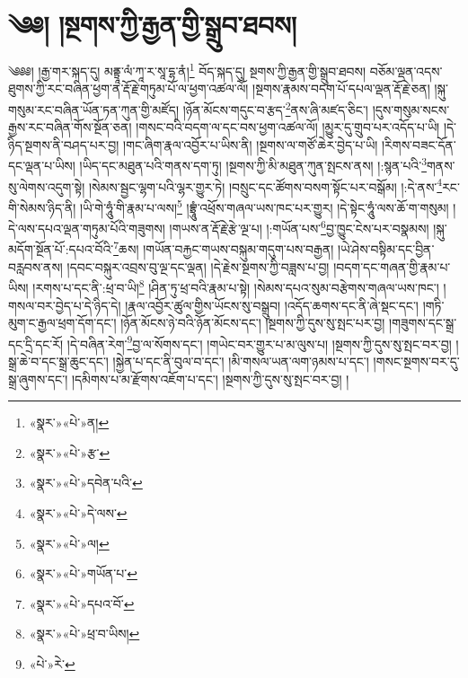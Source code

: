 \chapter{༄༅། །སྔགས་ཀྱི་རྒྱན་གྱི་སྒྲུབ་ཐབས།}༄༅༅། །རྒྱ་གར་སྐད་དུ། མནྟྲཱ་ལཾ་ཀཱ་ར་སཱ་དྷ་ནཾ།\footnote{«སྣར་»«པེ་»ན།} བོད་སྐད་དུ། སྔགས་ཀྱི་རྒྱན་གྱི་སྒྲུབ་ཐབས། བཅོམ་ལྡན་འདས་ཐུགས་ཀྱི་རང་བཞིན་ཕྱག་ན་རྡོ་རྗེ་གཏུམ་པོ་ལ་ཕྱག་འཚལ་ལོ། །སྔགས་རྣམས་བདག་པོ་དཔལ་ལྡན་རྡོ་རྗེ་ཅན། །སྐུ་གསུམ་རང་བཞིན་ཡོན་ཏན་ཀུན་གྱི་མཛོད། །ཉོན་མོངས་གདུང་བ་རྩད་\footnote{«སྣར་»«པེ་»རྩ་}ནས་ཞི་མཛད་ཅིང་། །དུས་གསུམ་སངས་རྒྱས་རང་བཞིན་གོས་སྔོན་ཅན། །གསང་བའི་བདག་ལ་དང་བས་ཕྱག་འཚལ་ལོ། །མྱུར་དུ་གྲུབ་པར་འདོད་པ་ཡི། །དེ་ཉིད་སྔགས་ནི་བཤད་པར་བྱ། །གང་ཞིག་རྣལ་འབྱོར་པ་ཡིས་ནི། །སྔགས་ལ་གཙོ་ཆེར་བྱེད་པ་ཡི། །རིགས་བཟང་དོན་དང་ལྡན་པ་ཡིས། །ཡིད་དང་མཐུན་པའི་གནས་དག་ཏུ། །སྔགས་ཀྱི་མི་མཐུན་ཀུན་སྤངས་ནས། །:སྙན་པའི་\footnote{«སྣར་»«པེ་»དབེན་པའི་}གནས་སུ་ལེགས་འདུག་སྟེ། །སེམས་སྦྱང་ལྷག་པའི་ལྷར་གྱུར་ཏེ། །བསྲུང་དང་ཚོགས་བསག་སྟོང་པར་བསྒོམ། །:དེ་ནས་\footnote{«སྣར་»«པེ་»དེ་ལས་}རང་གི་སེམས་ཉིད་ནི། །ཡི་གེ་ཧཱུཾ་གི་རྣམ་པ་ལས།\footnote{«སྣར་»«པེ་»ལ།} །བྷྲཱུཾ་འཕྲོས་གཞལ་ཡས་ཁང་པར་གྱུར། །དེ་སྟེང་ཧཱུཾ་ལས་ཆོ་ག་གསུམ། །དེ་ལས་དཔའ་ལྡན་གཏུམ་པོའི་གཟུགས། །གཡས་ན་རྡོ་རྗེ་རྩེ་ལྔ་པ། །:གཡོན་པས་\footnote{«སྣར་»«པེ་»གཡོན་པ་}བྱ་ཁྱུང་ངེས་པར་བསྣམས། །སྐུ་མདོག་སྔོན་པོ་:དཔའ་བོའི་\footnote{«སྣར་»«པེ་»དཔའ་བོ་}ཆས། །གཡོན་བརྐྱང་གཡས་བསྐུམ་གདུག་པས་བརྒྱན། །ཡེ་ཤེས་བསྟིམ་དང་བྱིན་བརླབས་ནས། །དབང་བསྐུར་འབྲས་བུ་ལྔ་དང་ལྡན། །དེ་རྗེས་སྔགས་ཀྱི་བཟླས་པ་བྱ། །བདག་དང་གཞན་གྱི་རྣམ་པ་ཡིས། །རགས་པ་དང་ནི་:ཕྲ་བ་ཡི།\footnote{«སྣར་»«པེ་»ཕྲ་བ་ཡིས།} །ཤིན་ཏུ་ཕྲ་བའི་རྣམ་པ་སྟེ། །སེམས་དཔའ་སུམ་བརྩེགས་གཞལ་ཡས་ཁང་། །གསལ་བར་བྱེད་པ་དེ་ཉིད་དེ། །རྣལ་འབྱོར་ཚུལ་གྱིས་ཡོངས་སུ་བསྒྲུབ། །འདོད་ཆགས་དང་ནི་ཞེ་སྡང་དང་། །གཏི་མུག་ང་རྒྱལ་ཕྲག་དོག་དང་། །ཉོན་མོངས་ཉེ་བའི་ཉོན་མོངས་དང་། །སྔགས་ཀྱི་དུས་སུ་སྤང་པར་བྱ། །གཟུགས་དང་སྒྲ་དང་དྲི་དང་རོ། །དེ་བཞིན་རེག་\footnote{«པེ་»རེ་}བྱ་ལ་སོགས་དང་། །གཡེང་བར་གྱུར་པ་མ་ལུས་པ། །སྔགས་ཀྱི་དུས་སུ་སྤང་བར་བྱ། །སྒྲ་ཆེ་བ་དང་སྒྲ་ཆུང་དང་། །སྐྱེན་པ་དང་ནི་བུལ་བ་དང་། །མི་གསལ་ཡན་ལག་ཉམས་པ་དང་། །གསང་སྔགས་བར་དུ་སྒྲ་ཞུགས་དང་། །དམིགས་པ་མ་རྫོགས་འཇོག་པ་དང་། །སྔགས་ཀྱི་དུས་སུ་སྤང་བར་བྱ། །
